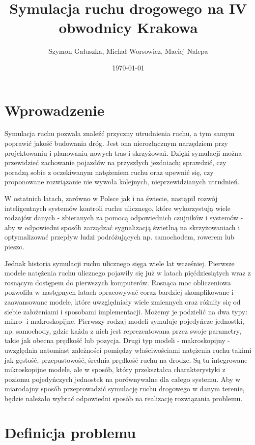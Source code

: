 \documentclass[a4paper,12pt]{article}
\title{Symulacja ruchu drogowego na IV obwodnicy Krakowa}
\author{Szymon Gałuszka, Michał Worsowicz, Maciej Nalepa}
\date{\today}
\begin{document}
	\maketitle
	
	\section{Wprowadzenie}
	
	Symulacja ruchu pozwala znaleźć przyczny utrudnienia ruchu, a tym samym poprawić jakość budowania dróg. Jest ona nierozłącznym narzędziem przy projektowaniu i planowaniu nowych tras i skrzyżowań. Dzięki symulacji można przewidzieć zachowanie pojazdów na przyszłych jezdniach; sprawdzić, czy poradzą sobie z oczekiwanym natężeniem ruchu oraz upewnić się, czy proponowane rozwiązanie nie wywoła kolejnych, nieprzewidzianych utrudnień.
	
	W ostatnich latach, zarówno w Polsce jak i na świecie, nastąpił rozwój inteligentnych systemów kontroli ruchu ulicznego, które wykorzystują wiele rodzajów danych - zbieranych za pomocą odpowiednich czujników i systemów - aby w  odpowiedni sposób zarządzać sygnalizacją świetlną na skrzyżowaniach i optymalizować przepływ ludzi podróżujących np. samochodem, rowerem lub pieszo.
	
	Jednak historia symulacji ruchu ulicznego sięga wiele lat wcześniej. Pierwsze modele natężenia ruchu ulicznego pojawiły się już w latach pięćdziesiątych wraz z rosnącym dostępem do pierwszych komputerów. Rosnąca moc obliczeniowa pozwoliła w następnych latach opracowywać coraz bardziej skomplikowane i zaawansowane modele, które uwzględniały wiele zmiennych oraz różniły się od siebie założeniami i sposobami implementacji. Możemy je podzielić na dwa typy: mikro- i makroskopijne. Pierwszy rodzaj modeli symuluje pojedyńcze jednostki, np. samochody, gdzie każda z nich jest reprezentowana przez swoje parametry, takie jak obecna prędkość lub pozycja. Drugi typ modeli - makroskopijny - uwzględnia natomiast zależności pomiędzy właściwościami natężenia ruchu takimi jak gęstość, przepustowość, średnia prędkość ruchu na drodze. Są tu integrowane mikroskopijne modele, ale w sposób, który przekształca charakterystyki z poziomu pojedyńczych jednostek na porównywalne dla całego systemu. Aby w miarodajny sposób przeprowadzić symulację ruchu drogowego w danym terenie, będzie należało wybrać odpowiedni sposób na realizację rozwiązania problemu.
	
	\section{Definicja problemu}
	
\end{document}
